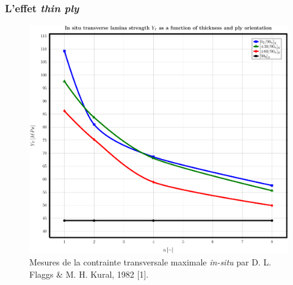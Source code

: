 \documentclass[first,firstsupp,lastsupp,handout,last,hyperref,table]{ETHclass}
\begin{document}
\begin{frame}
\frametitle{L'effet \textit{thin ply}}
\vspace{-0.5cm}
\centering
%
\begin{figure}[!h]
\centering
\includegraphics[height=0.75\textheight]{Flaggs-Kural_InSituTransverseStrength.pdf}
\caption{\tiny Mesures de la contrainte transversale maximale \textit{in-situ} par D. L. Flaggs \& M. H. Kural, 1982 [1].}
 \label{fig:in-situ-strength}
\end{figure}
\end{frame}
\end{document}
